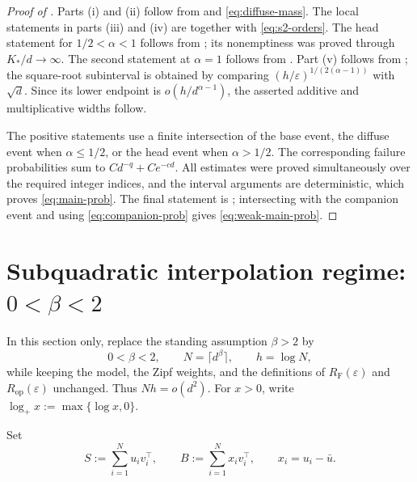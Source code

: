 \documentclass[11pt]{article}
\theoremstyle{definition}
\newcommand{\eps}{\varepsilon}
\begin{document}
\begin{proof}[Proof of ]
Parts (i) and (ii) follow from  and
\eqref{eq:diffuse-mass}.  The local statements in parts (iii) and (iv)
are  together with \eqref{eq:s2-orders}.
The head statement for $1/2<\alpha<1$ follows from
; its nonemptiness was proved
through $K_*/d\to\infty$.  The second statement at $\alpha=1$ follows
from .  Part (v) follows from
; the square-root subinterval
is obtained by comparing
$(h/\eps)^{1/(2(\alpha-1))}$ with $\sqrt d$.  Since its lower endpoint
is $o(h/d^{\alpha-1})$, the asserted additive and multiplicative widths
follow.

The positive statements use a finite intersection of the base event,
the diffuse event when $\alpha\leq1/2$, or the head event when
$\alpha>1/2$.  The corresponding failure probabilities sum to
$Cd^{-q}+Ce^{-cd}$.  All estimates were proved simultaneously over the
required integer indices, and the interval arguments are deterministic,
which proves \eqref{eq:main-prob}.  The final statement is
; intersecting with the companion event and using
\eqref{eq:companion-prob} gives \eqref{eq:weak-main-prob}.
\end{proof}

\section{Subquadratic interpolation regime: \texorpdfstring{$0<\beta<2$}{0 < beta < 2}}
\label{sec:subquadratic}

In this section only, replace the standing assumption $\beta>2$ by
\begin{equation}
 0<\beta<2,
 \qquad N=\lceil d^\beta\rceil,
 \qquad h=\log N,
 \label{eq:subquadratic-regime}
\end{equation}
while keeping the model, the Zipf weights, and the definitions of
$R_{\mathrm F}(\eps)$ and $R_{\mathrm{op}}(\eps)$ unchanged.  Thus
$Nh=o(d^2)$.  For $x>0$, write
$\log_+x:=\max\{\log x,0\}$.

Set
\begin{equation}
 S:=\sum_{i=1}^N u_iv_i^\top,
 \qquad
 B:=\sum_{i=1}^N x_iv_i^\top,
 \qquad x_i=u_i-\bar u.
 \label{eq:subquadratic-SB}
\end{equation}
\end{document}

